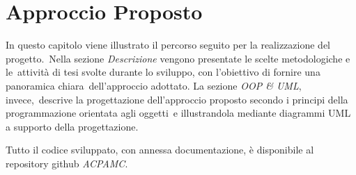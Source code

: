 \chapter{Approccio Proposto}

In questo capitolo viene illustrato il percorso seguito per la realizzazione del progetto.\
Nella sezione \textit{Descrizione} vengono presentate le scelte metodologiche e le\
attività di tesi svolte durante lo sviluppo, con l'obiettivo di fornire una panoramica chiara\
dell'approccio adottato. La sezione \textit{OOP \& UML}, invece,\
descrive la progettazione dell'approccio proposto secondo i principi della programmazione orientata agli oggetti\
e illustrandola mediante diagrammi UML a supporto della progettazione.

Tutto il codice sviluppato, con annessa documentazione, è disponibile al repository github \textit{ACPAMC}.


